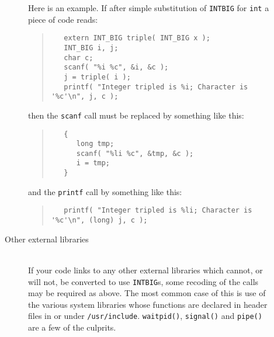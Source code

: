 \documentclass[twoside,11pt]{article}
\newcommand{\html}[1]{}
\renewcommand{\_}{\texttt{\symbol{95}}}
\newcommand{\file}[1]{{\tt #1}}
\newcommand{\cc}[1]{{\tt #1}}
\newcommand{\ditem}[1]{\item[#1]\mbox{}\\}
\newenvironment{squote}{\begin{quote}\begin{small}}{\end{small}\end{quote}}
\begin{document}
\begin{description}
\begin{description}
Here is an example.  If after simple substitution of \cc{INT\_BIG} for
\cc{int} a piece of code reads:
\begin{squote}
\begin{verbatim}
   extern INT_BIG triple( INT_BIG x );
   INT_BIG i, j;
   char c;
   scanf( "%i %c", &i, &c );
   j = triple( i );
   printf( "Integer tripled is %i; Character is '%c'\n", j, c );
\end{verbatim}
\end{squote}
then the \cc{scanf} call must be replaced by something like this:
\begin{squote}
\begin{verbatim}
   {
      long tmp;
      scanf( "%li %c", &tmp, &c );
      i = tmp;
   }
\end{verbatim}
\end{squote}
and the \cc{printf} call by something like this:
\begin{squote}
\begin{verbatim}
   printf( "Integer tripled is %li; Character is '%c'\n", (long) j, c );
\end{verbatim}
\end{squote}
\html{\begin{squote}\end{squote}}
%
\ditem{Other external libraries}
If your code links to any other external libraries
which cannot, or will not, be converted to use \cc{INT\_BIG}s,
some recoding of the calls may be required as above.
The most common case of this is use of the various system libraries
whose functions are declared in header files in or under \file{/usr/include}.
\cc{waitpid()}, \cc{signal()} and \cc{pipe()} are a few of the culprits.
\end{description}
%
\end{description}
\end{document}
